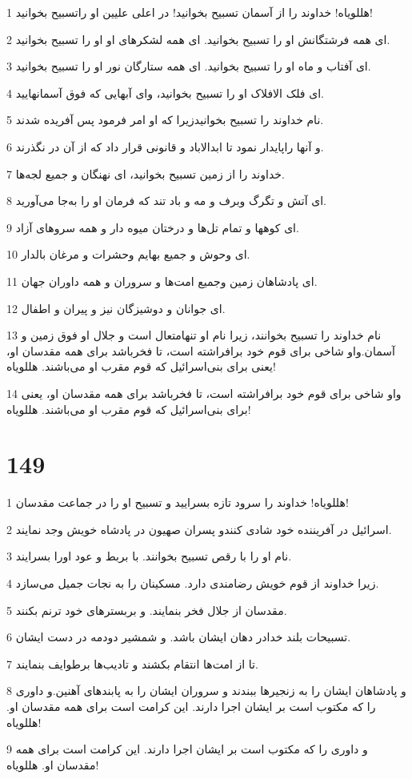 \par 1 هللویاه! خداوند را از آسمان تسبیح بخوانید! در اعلی علیین او راتسبیح بخوانید!
\par 2 ‌ای همه فرشتگانش او را تسبیح بخوانید. ای همه لشکرهای او او را تسبیح بخوانید.
\par 3 ‌ای آفتاب و ماه او را تسبیح بخوانید. ای همه ستارگان نور او را تسبیح بخوانید.
\par 4 ‌ای فلک الافلاک او را تسبیح بخوانید، و‌ای آبهایی که فوق آسمانهایید.
\par 5 نام خداوند را تسبیح بخوانیدزیرا که او امر فرمود پس آفریده شدند.
\par 6 و آنها راپایدار نمود تا ابدالاباد و قانونی قرار داد که از آن در نگذرند.
\par 7 خداوند را از زمین تسبیح بخوانید، ای نهنگان و جمیع لجه‌ها.
\par 8 ‌ای آتش و تگرگ وبرف و مه و باد تند که فرمان او را به‌جا می‌آورید.
\par 9 ‌ای کوهها و تمام تل‌ها و درختان میوه دار و همه سروهای آزاد.
\par 10 ‌ای وحوش و جمیع بهایم وحشرات و مرغان بالدار.
\par 11 ‌ای پادشاهان زمین وجمیع امت‌ها و سروران و همه داوران جهان.
\par 12 ‌ای جوانان و دوشیزگان نیز و پیران و اطفال.
\par 13 نام خداوند را تسبیح بخوانند، زیرا نام او تنهامتعال است و جلال او فوق زمین و آسمان.واو شاخی برای قوم خود برافراشته است، تا فخرباشد برای همه مقدسان او، یعنی برای بنی‌اسرائیل که قوم مقرب او می‌باشند. هللویاه!
\par 14 واو شاخی برای قوم خود برافراشته است، تا فخرباشد برای همه مقدسان او، یعنی برای بنی‌اسرائیل که قوم مقرب او می‌باشند. هللویاه!
 
\chapter{149}

\par 1 هللویاه! خداوند را سرود تازه بسرایید و تسبیح او را در جماعت مقدسان!
\par 2 اسرائیل در آفریننده خود شادی کنندو پسران صهیون در پادشاه خویش وجد نمایند.
\par 3 نام او را با رقص تسبیح بخوانند. با بربط و عود اورا بسرایند.
\par 4 زیرا خداوند از قوم خویش رضامندی دارد. مسکینان را به نجات جمیل می‌سازد.
\par 5 مقدسان از جلال فخر بنمایند. و بربسترهای خود ترنم بکنند.
\par 6 تسبیحات بلند خدادر دهان ایشان باشد. و شمشیر دو‌دمه در دست ایشان.
\par 7 تا از امت‌ها انتقام بکشند و تادیب‌ها برطوایف بنمایند.
\par 8 و پادشاهان ایشان را به زنجیرها ببندند و سروران ایشان را به پابندهای آهنین.و داوری را که مکتوب است بر ایشان اجرا دارند. این کرامت است برای همه مقدسان او. هللویاه!
\par 9 و داوری را که مکتوب است بر ایشان اجرا دارند. این کرامت است برای همه مقدسان او. هللویاه!
 
